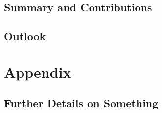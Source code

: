 \documentclass[%
  a4paper,fontsize=11pt,abstract=on,%
  twoside,BCOR=19mm,%
]{scrreprt}
\begin{document}
\section{Summary and Contributions}
\lipsum[1-3]
\section{Outlook}
\lipsum[1-3]



\appendix
\chapter{Appendix}
\section{Further Details on Something}
\lipsum



\printbibliography


\end{document}
